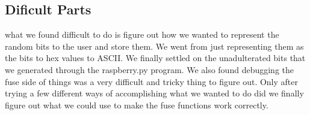 \documentclass{paper}
\begin{document}
\begin{doublespace}
\subsection{Dificult Parts}
what we found difficult to do is figure out how we wanted to represent the random bits to the user and store them. We went from just representing them as the bits to hex values to ASCII. We finally settled on the unadulterated bits that we generated through the raspberry.py program. We also found debugging the fuse side of things was a very difficult and tricky thing to figure out. Only after trying a few different ways of accomplishing what we wanted to do did we finally figure out what we could use to make the fuse functions work correctly. 
\end{doublespace}
\end{document}

